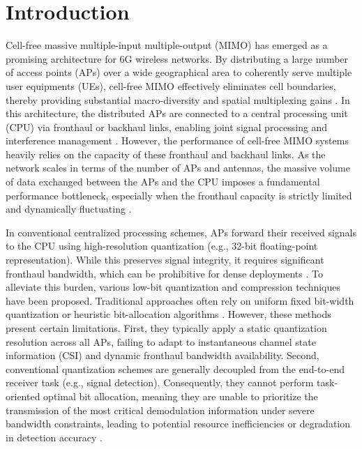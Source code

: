 \section{Introduction}

Cell-free massive multiple-input multiple-output (MIMO) has emerged as a promising architecture for 6G wireless networks. By distributing a large number of access points (APs) over a wide geographical area to coherently serve multiple user equipments (UEs), cell-free MIMO effectively eliminates cell boundaries, thereby providing substantial macro-diversity and spatial multiplexing gains \cite{bashar2020uplink, park2025scalable}. In this architecture, the distributed APs are connected to a central processing unit (CPU) via fronthaul or backhaul links, enabling joint signal processing and interference management \cite{li2024joint, park2013multihop}. However, the performance of cell-free MIMO systems heavily relies on the capacity of these fronthaul and backhaul links. As the network scales in terms of the number of APs and antennas, the massive volume of data exchanged between the APs and the CPU imposes a fundamental performance bottleneck, especially when the fronthaul capacity is strictly limited and dynamically fluctuating \cite{bashar2020exploiting, ranjbar2024joint}.

In conventional centralized processing schemes, APs forward their received signals to the CPU using high-resolution quantization (e.g., 32-bit floating-point representation). While this preserves signal integrity, it requires significant fronthaul bandwidth, which can be prohibitive for dense deployments \cite{park2025scalable}. To alleviate this burden, various low-bit quantization and compression techniques have been proposed. Traditional approaches often rely on uniform fixed bit-width quantization or heuristic bit-allocation algorithms \cite{bashar2020uplink, kim2024meta}. However, these methods present certain limitations. First, they typically apply a static quantization resolution across all APs, failing to adapt to instantaneous channel state information (CSI) and dynamic fronthaul bandwidth availability. Second, conventional quantization schemes are generally decoupled from the end-to-end receiver task (e.g., signal detection). Consequently, they cannot perform task-oriented optimal bit allocation, meaning they are unable to prioritize the transmission of the most critical demodulation information under severe bandwidth constraints, leading to potential resource inefficiencies or degradation in detection accuracy \cite{ranjbar2024joint}.

